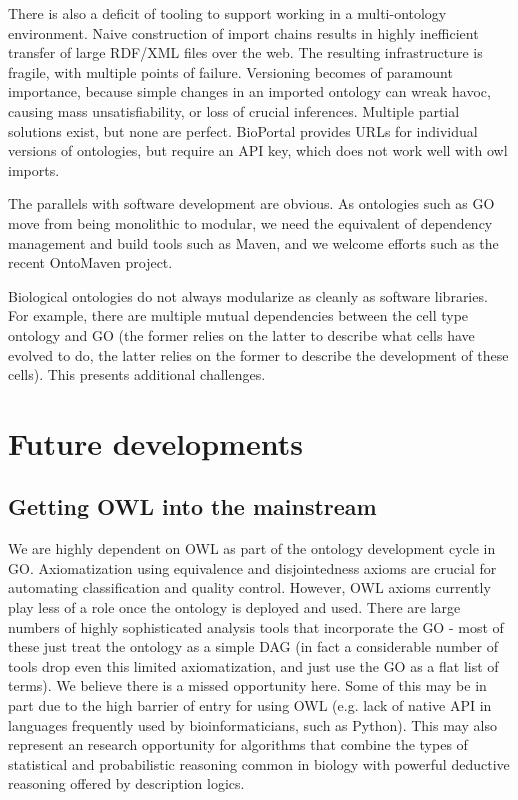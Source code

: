\documentclass{llncs}
\begin{document}
There is also a deficit of tooling to support working in a
multi-ontology environment. Naive construction of import chains
results in highly inefficient transfer of large RDF/XML files over the
web. The resulting infrastructure is fragile, with multiple points of
failure. Versioning becomes of paramount importance, because simple
changes in an imported ontology can wreak havoc, causing mass
unsatisfiability, or loss of crucial inferences. Multiple partial
solutions exist, but none are perfect. BioPortal provides URLs for
individual versions of ontologies, but require an API key, which does
not work well with owl imports.

The parallels with software development are obvious. As ontologies
such as GO move from being monolithic to modular, we need the
equivalent of dependency management and build tools such as Maven, and
we welcome efforts such as the recent OntoMaven
project\cite{paschke2013ontomaven}.

Biological ontologies do not always modularize as cleanly as software
libraries. For example, there are multiple mutual dependencies between
the cell type ontology and GO (the former relies on the latter to
describe what cells have evolved to do, the latter relies on the
former to describe the development of these cells). This presents
additional challenges.



\section{Future developments}

\subsection{Getting OWL into the mainstream}

We are highly dependent on OWL as part of the ontology development
cycle in GO. Axiomatization using equivalence and disjointedness
axioms are crucial for automating classification and quality
control. However, OWL axioms currently play less of a role once the ontology
is deployed and used. There are large numbers of highly sophisticated
analysis tools that incorporate the GO - most of these just treat the
ontology as a simple DAG (in fact a considerable number of tools drop
even this limited axiomatization, and just use the GO as a flat list
of terms). We believe there is a missed opportunity here. Some of this
may be in part due to the high barrier of entry for using OWL
(e.g. lack of native API in languages frequently used by
bioinformaticians, such as Python). This may also represent an
research opportunity for algorithms that combine the types of
statistical and probabilistic reasoning common in biology with
powerful deductive reasoning offered by description logics.
\end{document}
